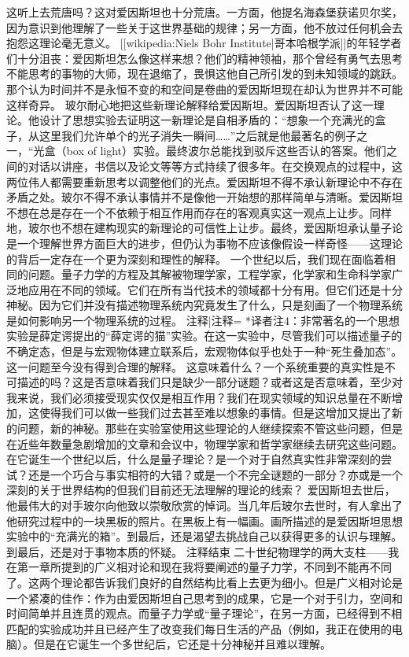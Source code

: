     这听上去荒唐吗？这对爱因斯坦也十分荒唐。一方面，他提名海森堡获诺贝尔奖，因为意识到他理解了一些关于这世界基础的规律；另一方面，他不放过任何机会去抱怨这理论毫无意义。
    [[wikipedia:Niels Bohr Institute|哥本哈根学派]]的年轻学者们十分沮丧：爱因斯坦怎么像这样来想？他们的精神领袖，那个曾经有勇气去思考不能思考的事物的大师，现在退缩了，畏惧这他自己所引发的到未知领域的跳跃。那个认为时间并不是永恒不变的和空间是卷曲的爱因斯坦现在却认为世界并不可能这样奇异。
    玻尔耐心地把这些新理论解释给爱因斯坦。爱因斯坦否认了这一理论。他设计了思想实验去证明这一新理论是自相矛盾的：“想象一个充满光的盒子，从这里我们允许单个的光子消失一瞬间……”之后就是他最著名的例子之一，“光盒（box of light）实验。最终波尔总能找到驳斥这些否认的答案。他们之间的对话以讲座，书信以及论文等等方式持续了很多年。在交换观点的过程中，这两位伟人都需要重新思考以调整他们的光点。爱因斯坦不得不承认新理论中不存在矛盾之处。玻尔不得不承认事情并不是像他一开始想的那样简单与清晰。爱因斯坦不想在总是存在一个不依赖于相互作用而存在的客观真实这一观点上让步。同样地，玻尔也不想在建构现实的新理论的可信性上让步。最终，爱因斯坦承认量子论是一个理解世界方面巨大的进步，但仍认为事物不应该像假设一样奇怪——这理论的背后一定存在一个更为深刻和理性的解释。
    一个世纪以后，我们现在面临着相同的问题。量子力学的方程及其解被物理学家，工程学家，化学家和生命科学家广泛地应用在不同的领域。它们在所有当代技术的领域都十分有用。但它们还是十分神秘。因为它们并没有描述物理系统内究竟发生了什么，只是刻画了一个物理系统是如何影响另一个物理系统的过程。
{{注释|注释=
*译者注4：非常著名的一个思想实验是薛定谔提出的“薛定谔的猫”实验。在这一实验中，尽管我们可以描述量子的不确定态，但是与宏观物体建立联系后，宏观物体似乎也处于一种“死生叠加态”。这一问题至今没有得到合理的解释。
}}
    这意味着什么？一个系统重要的真实性是不可描述的吗？这是否意味着我们只是缺少一部分谜题？或者这是否意味着，至少对我来说，我们必须接受现实仅仅是相互作用？我们在现实领域的知识总量在不断增加，这使得我们可以做一些我们过去甚至难以想象的事情。但是这增加又提出了新的问题，新的神秘。那些在实验室使用这些理论的人继续探索不管这些问题，但是在近些年数量急剧增加的文章和会议中，物理学家和哲学家继续去研究这些问题。在它诞生一个世纪以后，什么是量子理论？是一个对于自然真实性非常深刻的尝试？还是一个巧合与事实相符的大错？或是一个不完全谜题的一部分？亦或是一个深刻的关于世界结构的但我们目前还无法理解的理论的线索？
    爱因斯坦去世后，他最伟大的对手玻尔向他致以崇敬欣赏的悼词。当几年后玻尔去世时，有人拿出了他研究过程中的一块黑板的照片。在黑板上有一幅画。画所描述的是爱因斯坦思想实验中的“充满光的箱”。到最后，还是渴望去挑战自己以获得更多的认识与理解。到最后，还是对于事物本质的怀疑。
{{注释结束}}
    二十世纪物理学的两大支柱——我在第一章所提到的广义相对论和现在我将要阐述的量子力学，不同到不能再不同了。这两个理论都告诉我们良好的自然结构比看上去更为细小。但是广义相对论是一个紧凑的佳作：作为由爱因斯坦自己思考到的成果，它是一个对于引力，空间和时间简单并且连贯的观点。而量子力学或“量子理论”，在另一方面，已经得到不相匹配的实验成功并且已经产生了改变我们每日生活的产品（例如，我正在使用的电脑）。但是在它诞生一个多世纪后，它还是十分神秘并且难以理解。

